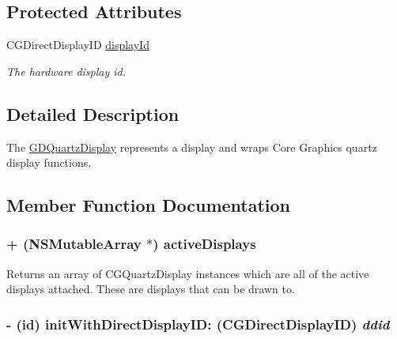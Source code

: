 \subsection*{Protected Attributes}
\begin{DoxyCompactItemize}
\item 
\hypertarget{interface_g_d_quartz_display_a0ff4eaf16075197719219a4eb1d21d47}{
CGDirectDisplayID \hyperlink{interface_g_d_quartz_display_a0ff4eaf16075197719219a4eb1d21d47}{displayId}}
\label{interface_g_d_quartz_display_a0ff4eaf16075197719219a4eb1d21d47}

\begin{DoxyCompactList}\small\item\em The hardware display id. \item\end{DoxyCompactList}\end{DoxyCompactItemize}


\subsection{Detailed Description}
The \hyperlink{interface_g_d_quartz_display}{GDQuartzDisplay} represents a display and wraps Core Graphics quartz display functions. 

\subsection{Member Function Documentation}
\hypertarget{interface_g_d_quartz_display_af590fc7b76cf0a54981edd0537919f7b}{
\subsubsection[{activeDisplays}]{\setlength{\rightskip}{0pt plus 5cm}+ (NSMutableArray $\ast$) activeDisplays }}
\label{interface_g_d_quartz_display_af590fc7b76cf0a54981edd0537919f7b}


Returns an array of CGQuartzDisplay instances which are all of the active displays attached. These are displays that can be drawn to. \hypertarget{interface_g_d_quartz_display_add090bbaebeff9ba7f5298cd2e50a991}{
\subsubsection[{initWithDirectDisplayID:}]{\setlength{\rightskip}{0pt plus 5cm}-\/ (id) initWithDirectDisplayID: (CGDirectDisplayID) {\em ddid}}}
\label{interface_g_d_quartz_display_add090bbaebeff9ba7f5298cd2e50a991}


